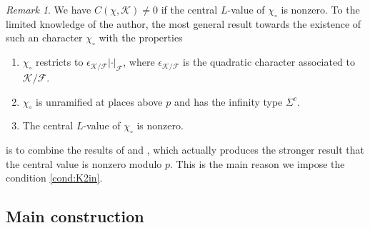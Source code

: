 \documentclass[leqno]{amsart}
\theoremstyle{definition}
\theoremstyle{remark}
\newtheorem{rem}[thm]{Remark}
\newcommand{\F}{{\mathcal{F}}} %
\newcommand{\K}{{\mathcal{K}}} %
\newcommand{\qch}{\epsilon} %
\begin{document}
\begin{rem}
We have $C(\chi,\K)\neq 0$ if the central 
$L$-value of $\chi_\circ$ is nonzero.
To the limited knowledge of the author, 
the most general result towards the existence of
such an character $\chi_\circ$ with the properties
\begin{enumerate}[label={($\chi$\arabic*)}]
    \item $\chi_\circ$ restricts to $\qch_{\K/\F}|\cdot|_{\F}$,
    where $\qch_{\K/\F}$ is the quadratic character associated
    to $\K/\F$.
    \item $\chi_\circ$ is unramified at places above $p$ and has
    the infinity type $\Sigma^c$.
    \item \label{cond:chi1}
    The central $L$-value of $\chi_\circ$ is nonzero.
\end{enumerate}
is to combine the results of \cite{Rohrlich} and \cite{Hsieh2012},
which actually produces the stronger result that 
the central value is nonzero modulo $p$.
This is the main reason we impose the condition \eqref{cond:K2in}.
\end{rem}





\subsection{Main construction}
\end{document}
